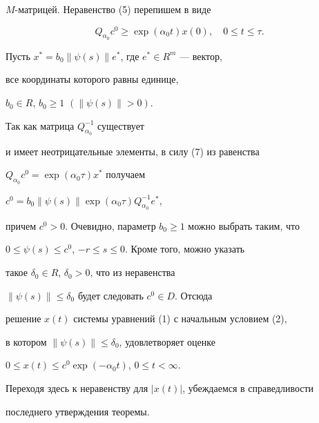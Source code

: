 \begin{pf}
$M$-матрицей. Неравенство (5) перепишем в виде


\begin{equation}


Q_{\alpha_0} c^0 \ge \exp(\alpha_0 t) x(0),


\quad 0 \le t \le \tau.


\end{equation}


Пусть $x^* = b_0 \|\psi(s)\| e^*$, где $e^*\in R^m$ --- вектор,


все координаты которого равны единице,


$b_0 \in R$, $b_0 \ge 1$ $(\|\psi(s)\|>0)$.


Так как матрица $Q_{\alpha_0}^{-1}$ существует


и имеет неотрицательные элементы, в силу (7) из равенства


$Q_{\alpha_0} c^0=\exp(\alpha_0 \tau)x^*$ получаем


$c^0 = b_0 \|\psi(s)\| \exp(\alpha_0 \tau) Q_{\alpha_0}^{-1} e^*$,


причем $c^0 > 0$. Очевидно, параметр $b_0 \ge 1$ можно выбрать таким, что


$0 \le \psi(s) \le c^0$, $-r\le s \le 0$. Кроме того, можно указать


такое $\delta_0 \in R$, $\delta_0 > 0$, что из неравенства


$\|\psi(s)\| \le \delta_0$ будет следовать $c^0 \in D$. Отсюда


решение $x(t)$ системы уравнений (1) с начальным условием (2),


в котором $\|\psi(s)\| \le \delta_0$, удовлетворяет оценке


$0 \le x(t) \le c^0 \exp(-\alpha_0 t)$, $0 \le t < \infty$.


Переходя здесь к неравенству для $|x(t)|$, убеждаемся в справедливости


последнего утверждения теоремы.


\end{pf}





